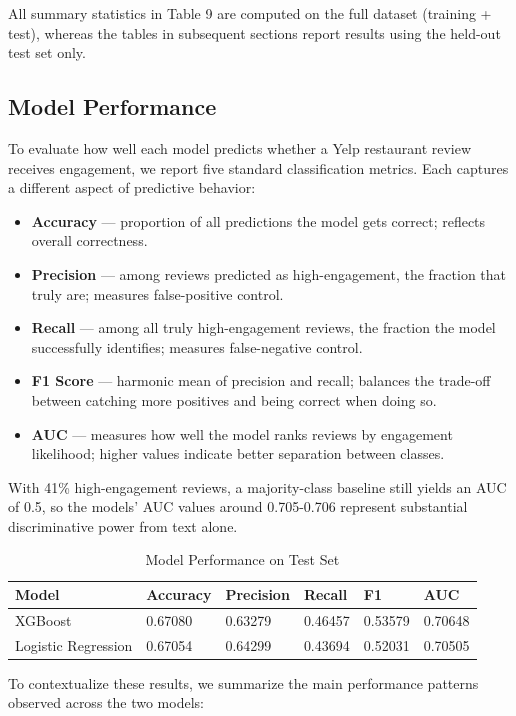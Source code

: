 \documentclass[12pt]{article}
\begin{document}
\noindent
All summary statistics in Table 9 are computed on the full dataset (training + test), whereas the tables in subsequent sections report results using the held-out test set only.

\subsection{Model Performance}

To evaluate how well each model predicts whether a Yelp restaurant review receives engagement, we report five standard classification metrics. Each captures a different aspect of predictive behavior:

\begin{itemize}
\item \textbf{Accuracy} — proportion of all predictions the model gets correct; reflects overall correctness.
\item \textbf{Precision} — among reviews predicted as high-engagement, the fraction that truly are; measures false-positive control.
\item \textbf{Recall} — among all truly high-engagement reviews, the fraction the model successfully identifies; measures false-negative control.
\item \textbf{F1 Score} — harmonic mean of precision and recall; balances the trade-off between catching more positives and being correct when doing so.
\item \textbf{AUC} — measures how well the model ranks reviews by engagement likelihood; higher values indicate better separation between classes.
\end{itemize}

With 41\% high-engagement reviews, a majority-class baseline still yields an AUC of 0.5, so the models' AUC values around 0.705-0.706 represent substantial discriminative power from text alone.

\begin{longtable}{llllll}
\caption{Model Performance on Test Set} \\
\textbf{Model} & \textbf{Accuracy} & \textbf{Precision} & \textbf{Recall} & \textbf{F1} & \textbf{AUC} \\
\hline
XGBoost & 0.67080 & 0.63279 & 0.46457 & 0.53579 & 0.70648 \\
Logistic Regression & 0.67054 & 0.64299 & 0.43694 & 0.52031 & 0.70505 \\
\end{longtable}


To contextualize these results, we summarize the main performance patterns observed across the two models:
\end{document}
